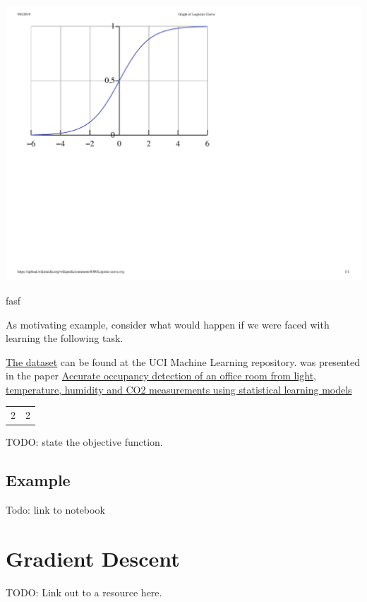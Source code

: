 \documentclass[assignment03_Solutions]{subfiles}
\begin{document}
\begin{marginfigure}
\includegraphics[width=\linewidth]{figures/Logistic-curve}
\caption{fasf}\label{fig:sigmoid}
\end{marginfigure}
\ee

As motivating example, consider what would happen if we were faced with learning the following task.

\href{https://archive.ics.uci.edu/ml/datasets/Occupancy+Detection+}{The dataset} can be found at the UCI Machine Learning repository.  was presented in the paper \href{https://www.sciencedirect.com/science/article/pii/S0378778815304357}{Accurate occupancy detection of an office room from light, temperature, humidity and CO2 measurements using statistical learning models}

\begin{table}
\begin{tabular}{c | c}
2 & 2
\end{tabular}
\end{table}

TODO: state the objective function.

\subsection{Example}
Todo: link to notebook

\section{Gradient Descent}

TODO: Link out to a resource here.
\end{document}
